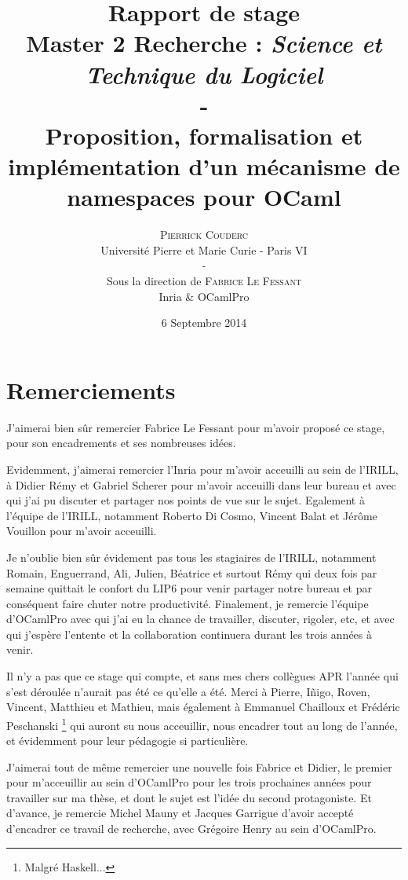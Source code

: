 \documentclass[11pt,a4paper]{report}
\title{
  \textbf{Rapport de stage} \\
  Master 2 Recherche : \emph{Science et Technique du Logiciel}
  \\ - \\
  Proposition, formalisation et implémentation d'un mécanisme de namespaces
  pour OCaml\\ %
}
\author{\textsc{Pierrick Couderc} \\
  Université Pierre et Marie Curie - Paris VI \\ - \\
  Sous la direction de \textsc{Fabrice Le Fessant} \\
  Inria \& OCamlPro
}
\date{6 Septembre 2014}
\begin{document}
\maketitle

\section*{Remerciements}

J'aimerai bien sûr remercier Fabrice Le Fessant pour m'avoir proposé ce stage,
pour son encadrements et ses nombreuses idées.

Evidemment, j'aimerai remercier l'Inria pour m'avoir acceuilli au sein de
l'IRILL, à Didier Rémy et Gabriel Scherer pour m'avoir acceuilli dans leur
bureau et avec qui j'ai pu discuter et partager nos points de vue sur le
sujet. Egalement à l'équipe de l'IRILL, notamment Roberto Di Cosmo, Vincent
Balat et Jérôme Vouillon pour m'avoir acceuilli.

Je n'oublie bien sûr évidement pas tous les stagiaires de l'IRILL, notamment
Romain, Enguerrand, Ali, Julien, Béatrice et surtout Rémy qui deux fois par
semaine quittait le confort du LIP6 pour venir partager notre bureau et par
conséquent faire chuter notre productivité. Finalement, je remercie l'équipe
d'OCamlPro avec qui j'ai eu la chance de travailler, discuter, rigoler, etc, et
avec qui j'espère l'entente et la collaboration continuera durant les trois
années à venir.

Il n'y a pas que ce stage qui compte, et sans mes chers collègues APR l'année
qui s'est déroulée n'aurait pas été ce qu'elle a été. Merci à Pierre, I\~nigo,
Roven, Vincent, Matthieu et Mathieu, mais également à Emmanuel Chailloux et
Frédéric Peschanski \footnote{Malgré Haskell...} qui auront su nous acceuillir,
nous encadrer tout au long de l'année, et évidemment pour leur pédagogie si
particulière.

J'aimerai tout de même remercier une nouvelle fois Fabrice et Didier, le premier
pour m'acceuillir au sein d'OCamlPro pour les trois prochaines années pour
travailler sur ma thèse, et dont le sujet est l'idée du second protagoniste. Et
d'avance, je remercie Michel Mauny et Jacques Garrigue d'avoir accepté
d'encadrer ce travail de recherche, avec Grégoire Henry au sein d'OCamlPro.
\end{document}
